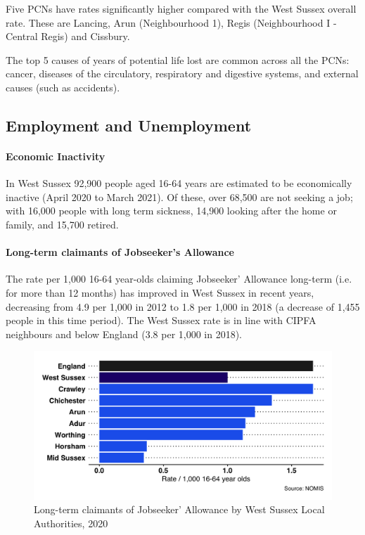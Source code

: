 

Five PCNs have rates significantly higher compared with the West Sussex overall rate. These are Lancing, Arun (Neighbourhood 1), Regis (Neighbourhood I - Central Regis) and Cissbury. 

The top 5 causes of years of potential life lost are common across all the PCNs: cancer, diseases of the circulatory, respiratory and digestive systems, and external causes (such as accidents).

\subsection{Employment and Unemployment}
\paragraph{Economic Inactivity}
In West Sussex 92,900 people aged 16-64 years are estimated to be economically inactive (April 2020 to March 2021). Of these, over 68,500 are not seeking a job; with 16,000 people with long term sickness, 14,900 looking after the home or family, and 15,700 retired.

\paragraph{Long-term claimants of Jobseeker's Allowance}

The rate per 1,000 16-64 year-olds claiming Jobseeker' Allowance long-term (i.e. for more than 12 months) has improved in West Sussex in recent years, decreasing from 4.9 per 1,000 in 2012 to 1.8 per 1,000 in 2018 (a decrease of 1,455 people in this time period). The West Sussex rate is in line with CIPFA neighbours and below England (3.8 per 1,000 in 2018).

\begin{figure}[htp]
    \caption{Long-term claimants of Jobseeker' Allowance by West Sussex Local Authorities, 2020}\label{fig:longterm_jsa}
    \centering
	\includegraphics[width=.9\linewidth]{images/longterm_jsa_claimants_wsx.png}
\end{figure}

